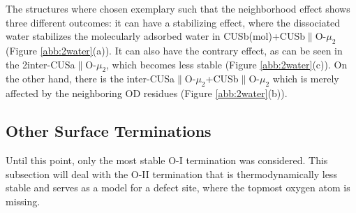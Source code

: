 \documentclass[11pt,DIV=13,BCOR=5mm,a4paper,headinclude]{scrbook}
\begin{document}
The structures where chosen exemplary such that the neighborhood effect shows three different outcomes: it can have a stabilizing effect, where the dissociated water stabilizes the molecularly adsorbed water in CUSb(mol)+CUSb$\parallel$O-$\mu_2$ (Figure \ref{abb:2water}(a)).
It can also have the contrary effect, as can be seen in the  2inter-CUSa$\parallel$O-$\mu_2$, which becomes less stable (Figure \ref{abb:2water}(c)).
On the other hand, there is the inter-CUSa$\parallel$O-$\mu_2$+CUSb$\parallel$O-$\mu_2$ which is merely affected by the neighboring OD residues (Figure \ref{abb:2water}(b)).

\subsection{Other Surface Terminations}\label{O-II-term}
Until this point, only the most stable O-I termination was considered.
This subsection will deal with the O-II termination that is thermodynamically less stable and serves as a model for a defect site, where the topmost oxygen atom is missing.
\end{document}
